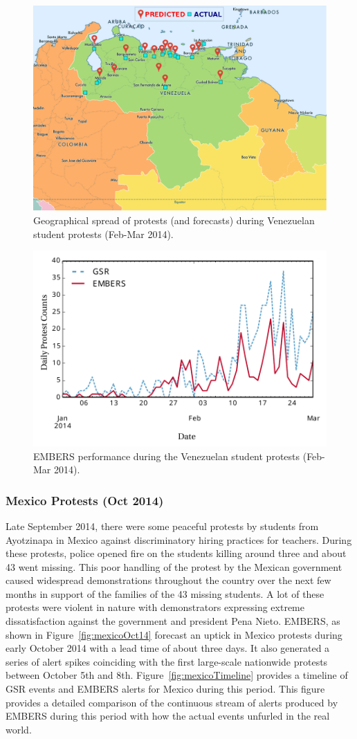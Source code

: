 \documentclass[11pt,a4paper,extrafontsizes,oneside]{article}
\begin{document}
\begin{figure} \centering
\includegraphics[width=.6\columnwidth]{venezuelaMap}
\caption{Geographical spread of protests (and forecasts) during
Venezuelan student protests (Feb-Mar 2014).}
\label{fig:venezuelaMap}
\end{figure}

\begin{figure} \centering
\includegraphics[width=.8\columnwidth]{venezuelaFeb14}
\caption{EMBERS performance during the Venezuelan student protests (Feb-Mar 2014).}
\label{fig:venezuelaMarch14}
\end{figure}

\subsubsection*{Mexico Protests (Oct 2014)}
\label{sec:mexico}
Late September 2014, there were some peaceful protests by students from Ayotzinapa
in Mexico against discriminatory hiring practices for teachers. During
these protests,
police opened fire on the students killing around three and about 43 went missing. This poor
handling of the protest by the Mexican government caused widespread demonstrations throughout
the country over the next few months in support of the families of the 43 missing students.
A lot of these protests were violent in nature with demonstrators expressing extreme
dissatisfaction against the government and president Pena Nieto. EMBERS, as
shown in Figure~\ref{fig:mexicoOct14}
forecast an uptick in Mexico protests during early October 2014 with a lead time of about three days.
It also generated  a series of alert spikes coinciding with the first
large-scale nationwide protests between October 5th and 8th.
Figure~\ref{fig:mexicoTimeline} provides a timeline of GSR events and
EMBERS alerts for Mexico during this period. This figure provides a detailed
comparison of the continuous stream of alerts produced by EMBERS during this period with how
the actual events unfurled in the real world.
\end{document}
